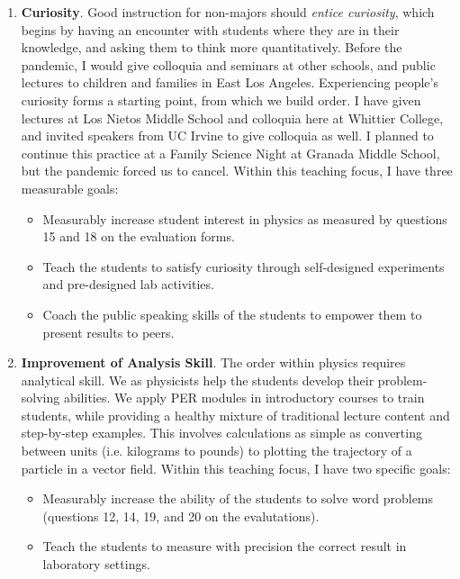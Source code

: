 \documentclass[../../../main.tex]{subfiles}
\begin{document}
\begin{enumerate}
\item \textbf{Curiosity}.  Good instruction for non-majors should \textit{entice curiosity}, which begins by having an encounter with students where they are in their knowledge, and asking them to think more quantitatively.  Before the pandemic, I would give colloquia and seminars at other schools, and public lectures to children and families in East Los Angeles.  Experiencing people's curiosity forms a starting point, from which we build order.  I have given lectures at Los Nietos Middle School and colloquia here at Whittier College, and invited speakers from UC Irvine to give colloquia as well.  I planned to continue this practice at a Family Science Night at Granada Middle School, but the pandemic forced us to cancel.  Within this teaching focus, I have three measurable goals:

\begin{itemize}
\item Measurably increase student interest in physics as measured by questions 15 and 18 on the evaluation forms.
\item Teach the students to satisfy curiosity through self-designed experiments and pre-designed lab activities.
\item Coach the public speaking skills of the students to empower them to present results to peers.
\end{itemize}

\item \textbf{Improvement of Analysis Skill}.  The order within physics requires analytical skill.  We as physicists help the students develop their problem-solving abilities.  We apply PER modules in introductory courses to train students, while providing a healthy mixture of traditional lecture content and step-by-step examples.  This involves calculations as simple as converting between units (i.e. kilograms to pounds) to plotting the trajectory of a particle in a vector field.  Within this teaching focus, I have two specific goals:

\begin{itemize}
\item Measurably increase the ability of the students to solve word problems (questions 12, 14, 19, and 20 on the evalutations).
\item Teach the students to measure with precision the correct result in laboratory settings.
\end{itemize}


\end{enumerate}
\end{document}
